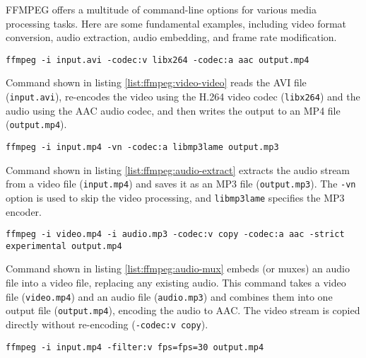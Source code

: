 FFMPEG offers a multitude of command-line options for various media processing tasks. Here are some fundamental examples, including video format conversion, audio extraction, audio embedding, and frame rate modification.

\begin{clisting}
\label{list:ffmpeg:video-video}
\begin{verbatim}
ffmpeg -i input.avi -codec:v libx264 -codec:a aac output.mp4
\end{verbatim}
\end{clisting}

Command shown in listing \ref{list:ffmpeg:video-video} reads the AVI file (\texttt{input.avi}), re-encodes the video using the H.264 video codec (\texttt{libx264}) and the audio using the AAC audio codec, and then writes the output to an MP4 file (\texttt{output.mp4}).

\begin{clisting}
\label{list:ffmpeg:audio-extract}
\begin{verbatim}
ffmpeg -i input.mp4 -vn -codec:a libmp3lame output.mp3
\end{verbatim}
\end{clisting}

Command shown in listing \ref{list:ffmpeg:audio-extract} extracts the audio stream from a video file (\texttt{input.mp4}) and saves it as an MP3 file (\texttt{output.mp3}). The \texttt{-vn} option is used to skip the video processing, and \texttt{libmp3lame} specifies the MP3 encoder.

\begin{clisting}
\label{list:ffmpeg:audio-mux}
\begin{verbatim}
ffmpeg -i video.mp4 -i audio.mp3 -codec:v copy -codec:a aac -strict experimental output.mp4
\end{verbatim}
\end{clisting}

Command shown in listing \ref{list:ffmpeg:audio-mux} embeds (or muxes) an audio file into a video file, replacing any existing audio. This command takes a video file (\texttt{video.mp4}) and an audio file (\texttt{audio.mp3}) and combines them into one output file (\texttt{output.mp4}), encoding the audio to AAC. The video stream is copied directly without re-encoding (\texttt{-codec:v copy}).

\begin{clisting}
\label{list:ffmpeg:change-fps}
\begin{verbatim}
ffmpeg -i input.mp4 -filter:v fps=fps=30 output.mp4
\end{verbatim}
\end{clisting}

